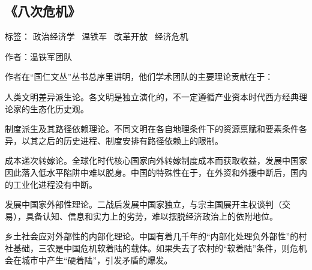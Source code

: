 \subsection{《八次危机》}

标签： 政治经济学 \ 温铁军 \ 改革开放 \ 经济危机

作者：温铁军团队

作者在“国仁文丛”丛书总序里讲明，他们学术团队的主要理论贡献在于：
\begin{itemize*}
    \item 人类文明差异派生论。各文明是独立演化的，不一定遵循产业资本时代西方经典理论家的生态化历史观。
    \item 制度派生及其路径依赖理论。不同文明在各自地理条件下的资源禀赋和要素条件各异，以其之后的历史进程、制度安排有路径依赖上的限制。
    \item 成本递次转嫁论。全球化时代核心国家向外转嫁制度成本而获取收益，发展中国家因此落入低水平陷阱中难以脱身。中国的特殊性在于，在外资和外援中断后，国内的工业化进程没有中断。
    \item 发展中国家外部性理论。二战后发展中国家独立，与宗主国展开主权谈判（交易），具备认知、信息和实力上的劣势，难以摆脱经济政治上的依附地位。
    \item 乡土社会应对外部性的内部化理论。中国有着几千年的“内部化处理负外部性”的村社基础，三农是中国危机软着陆的载体。如果失去了农村的“软着陆”条件，则危机会在城市中产生“硬着陆”，引发矛盾的爆发。
\end{itemize*}


